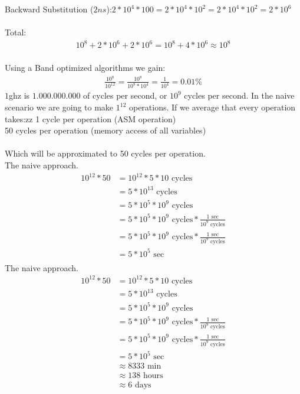 \documentclass{article}
\begin{document}
	Backward Substitution ($2ns$):$ 2*10^{4}*100 = 2*10^{4}*10^{2} = 2*10^{4}*10^{2} = 2*10^6$\\
	\\
	Total:\\
	\begin{align*}
		10^8 + 2*10^6 + 2*10^6 = 10^8 + 4*10^6 \approx 10^{8}
	\end{align*}
	\\
	Using a Band optimized algorithms we gain:\\
	\begin{align*}
		\frac{10^8}{10^{12}} = 	\frac{10^8}{10^{8}*10^{4}} = \frac{1}{10^{4}} = 0.01 \%
	\end{align*}
	$1$ghz is $1.000.000.000$ of cycles per second, or $10^9$ cycles per second. In the naive scenario we are going to make $1^12$ operations. If we average that every operation takes:zz
	1 cycle per operation (ASM operation)\\
	50 cycles per operation (memory access of all variables)\\
	\\
	Which will be approximated to 50 cycles per operation.\\
	The naive approach.\\
	\begin{align*}
		10^{12} * 50 &=	10^{12} * 5*10 \text{ cycles}\\
		&= 5*10^{13} \text{ cycles}\\
		&= 5*10^{5}*10^{9} \text{ cycles}\\
		&= 5*10^{5}*10^{9} \text{ cycles} * \frac{1 \text{ sec}}{10^9 \text{ cycles}}\\
		&= 5*10^{5}*10^{9} \text{ cycles} * \frac{1 \text{ sec}}{10^9 \text{ cycles}}\\		
		&= 5*10^{5} \text{ sec}\\		
	\end{align*}
	The naive approach.\\
	\begin{align*}
	10^{12} * 50 &=	10^{12} * 5*10 \text{ cycles}\\
	&= 5*10^{13} \text{ cycles}\\
	&= 5*10^{5}*10^{9} \text{ cycles}\\
	&= 5*10^{5}*10^{9} \text{ cycles} * \frac{1 \text{ sec}}{10^9 \text{ cycles}}\\
	&= 5*10^{5}*10^{9} \text{ cycles} * \frac{1 \text{ sec}}{10^9 \text{ cycles}}\\		
	&= 5*10^{5} \text{ sec}\\		
	&\approx 8333 \text{ min}\\		
	&\approx 138 \text{ hours}\\			
	&\approx 6 \text{ days}\\	
	\end{align*}
\end{document}
